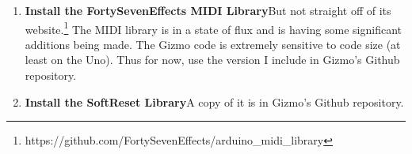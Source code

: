 \documentclass{article}
\begin{document}
\begin{enumerate}
\begin{enumerate}
\begin{verbatim}
    uint8_t TwoWire::endTransmissionNonblocking()
        {
        uint8_t ret = twi_writeTo(txAddress, txBuffer, txBufferLength, 0, 1);
        return ret;
        }
\end{verbatim}
\end{enumerate}

\paragraph{Reduce the I2C Buffer Size from 32 to 20} This gives us some extra static RAM space.

\begin{enumerate}
\item Locate your \texttt{Wire.h} file.  Again, on the Mac it's located in\\
\texttt{Arduino.app/Contents/Java/hardware/arduino/avr/libraries/Wire/src/}

\item Change the \texttt{BUFFER\_LENGTH} constant in the \texttt{Wire.h} file as follows:

\begin{verbatim}
        #define BUFFER_LENGTH 20   // Was 32
\end{verbatim}

\item Identify your \texttt{twi.h} file.  On the Mac it's located in\\
\texttt{Arduino.app/Contents/Java/hardware/arduino/avr/libraries/Wire/src/utility/}

\item Change the \texttt{TWIBUFFER\_LENGTH} constant in the \texttt{twi.h} file as follows:

\begin{verbatim}
        #define TWI_BUFFER_LENGTH 20    // Was 32
\end{verbatim}
\end{enumerate}

\item {\bf Install the FortySevenEffects MIDI Library}\quad But not straight off of its website.\footnote{https:/\!/github.com/FortySevenEffects/arduino\_midi\_library}  The MIDI library is in a state of flux and is having some significant additions being made.  The Gizmo code is extremely sensitive to code size (at least on the Uno).  Thus for now, use the version I include in Gizmo's Github repository.

\item {\bf Install the SoftReset Library}\quad A copy of it is in Gizmo's Github repository.


\end{enumerate}
\end{document}
